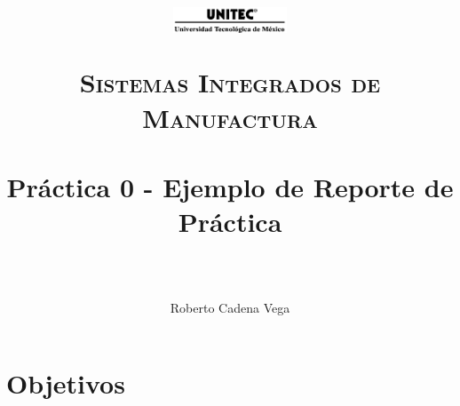 



\title{
	\normalfont \normalsize
	\begin{figure}[h]
		\begin{center}
			\includegraphics[width=0.3\textwidth]{./UNITEC.png}
		\end{center}
	\end{figure}
	\textsc{Sistemas Integrados de Manufactura} \\ [25pt]
	\horrule{0.5pt} \\[0.4cm] %
	\huge Práctica 0 - Ejemplo de Reporte de Práctica \\ %
	\horrule{2pt} \\[0.5cm] %
}

\author{Roberto Cadena Vega} %

\date{ } %




\maketitle %


\section{Objetivos}


